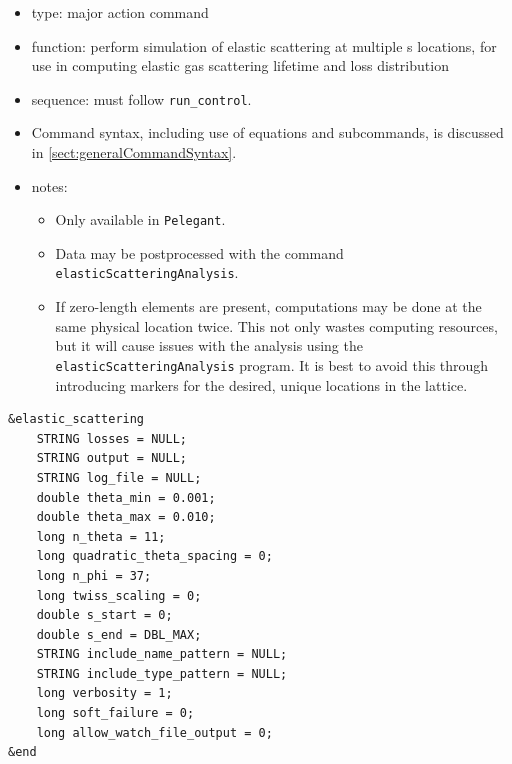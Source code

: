 \documentclass[11pt]{article}
\begin{document}
\begin{itemize}
\item type: major action command
\item function: perform simulation of elastic scattering at multiple s locations, for
  use in computing elastic gas scattering lifetime and loss distribution
\item sequence: must follow \verb|run_control|.
\item Command syntax, including use of equations and subcommands, is discussed in \ref{sect:generalCommandSyntax}.
\item notes: 
  \begin{itemize} 
    \item Only available in \verb|Pelegant|.
    \item Data may be postprocessed with the command \verb|elasticScatteringAnalysis|.
    \item If zero-length elements are present, computations may be done at the same physical location twice. 
      This not only wastes computing resources, but it will cause issues with the analysis using the
      \verb|elasticScatteringAnalysis| program. It is best to avoid this through introducing markers for
      the desired, unique locations in the lattice.
    \end{itemize}
\end{itemize}

\begin{verbatim}
&elastic_scattering
    STRING losses = NULL;
    STRING output = NULL;
    STRING log_file = NULL;
    double theta_min = 0.001;
    double theta_max = 0.010;
    long n_theta = 11;
    long quadratic_theta_spacing = 0;
    long n_phi = 37;
    long twiss_scaling = 0;
    double s_start = 0;
    double s_end = DBL_MAX;
    STRING include_name_pattern = NULL;
    STRING include_type_pattern = NULL;
    long verbosity = 1;        
    long soft_failure = 0;
    long allow_watch_file_output = 0;
&end
\end{verbatim}
\end{document}
